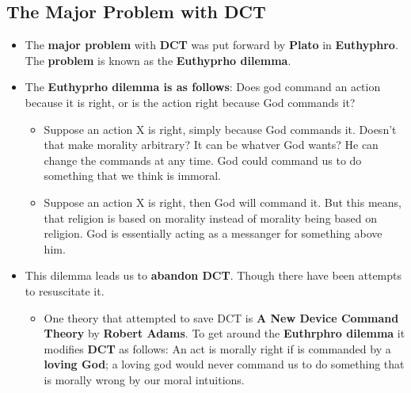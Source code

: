 \documentclass[16pt]{article}
\begin{document}
    \subsection*{The Major Problem with DCT}
    \begin{itemize}
        \item The \textbf{major problem} with \textbf{DCT} was put forward by \textbf{Plato} in \textbf{Euthyphro}. The \textbf{problem} is known as the \textbf{Euthyprho dilemma}.
        \item The \textbf{Euthyprho dilemma is as follows}: Does god command an action because it is right, or is the action right because God commands it?
        \begin{itemize}
            \item Suppose an action X is right, simply because God commands it. Doesn't that make morality arbitrary? It can be whatver God wants? He can change the commands at any time. God could command us to do something that we think is immoral.
            \item Suppose an action X is right, then God will command it. But this means, that religion is based on morality instead of morality being based on religion. God is essentially acting as a messanger for something above him.
        \end{itemize}
        \item This dilemma leads us to \textbf{abandon DCT}. Though there have been attempts to resuscitate it.
        \begin{itemize}
            \item One theory that attempted to save DCT is \textbf{A New Device Command Theory} by \textbf{Robert Adams}. To get around the \textbf{Euthrphro dilemma} it modifies \textbf{DCT} as follows: An act is morally right if is commanded by a \textbf{loving God}; a loving god would never command us to do something that is morally wrong by our moral intuitions.
        \end{itemize}
    \end{itemize}    
\end{document}
